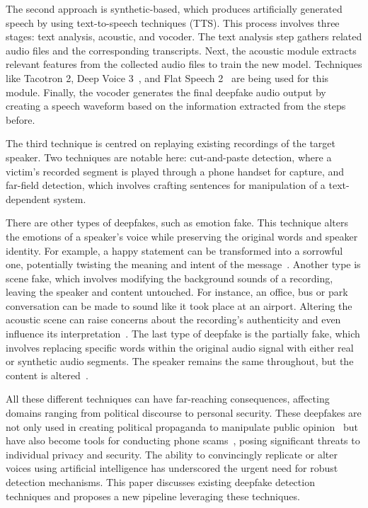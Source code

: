 \documentclass{Interspeech}
\begin{document}
The second approach is synthetic-based, which produces artificially generated
speech by using text-to-speech techniques (TTS). This process involves three
stages: text analysis, acoustic, and vocoder. The text analysis step gathers
related audio files and the corresponding transcripts. Next, the acoustic
module extracts relevant features from the collected audio files to train the
new model. Techniques like Tacotron 2, Deep Voice 3~\cite{ping2018deep}, and
Flat Speech 2~\cite{ren2022fastspeech} are being used for this module. Finally,
the vocoder generates the final deepfake audio output by creating a speech
waveform based on the information extracted from the steps before.

The third technique is centred on replaying existing recordings of the target
speaker. Two techniques are notable here: cut-and-paste detection, where a
victim's recorded segment is played through a phone handset for capture, and
far-field detection, which involves crafting sentences for manipulation of a
text-dependent system.

There are other types of deepfakes, such as emotion fake. This technique alters
the emotions of a speaker's voice while preserving the original words and
speaker identity. For example, a happy statement can be transformed into a
sorrowful one, potentially twisting the meaning and intent of the
message~\cite{zhao2023emofake}. Another type is scene fake, which involves
modifying the background sounds of a recording, leaving the speaker and content
untouched. For instance, an office, bus or park conversation can be made to
sound like it took place at an airport. Altering the acoustic scene can raise
concerns about the recording's authenticity and even influence its
interpretation~\cite{yi2022scenefake}. The last type of deepfake is the
partially fake, which involves replacing specific words within the original
audio signal with either real or synthetic audio segments. The speaker remains
the same throughout, but the content is altered~\cite{yi2023halftruth}.

All these different techniques can have far-reaching consequences, affecting
domains ranging from political discourse to personal security. These deepfakes
are not only used in creating political propaganda to manipulate public
opinion~\cite{stuanescuinformational} but have also become tools for conducting
phone scams~\cite{mirsky2022dfcaptcha}, posing significant threats to
individual privacy and security. The ability to convincingly replicate or alter
voices using artificial intelligence has underscored the urgent need for robust
detection mechanisms. This paper discusses existing deepfake detection
techniques and proposes a new pipeline leveraging these techniques.
\end{document}
